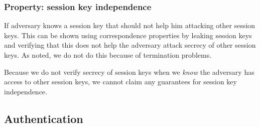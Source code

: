 \documentclass[a4paper,11pt]{article}
\theoremstyle{plain}
\theoremstyle{plain}
\begin{document}
\subsubsection{Property: session key independence}
%
If adversary knows a session key that should not help him attacking other
session keys.
%
This can be shown using correspondence properties by leaking session keys and
verifying that this does not help the adversary attack secrecy of other session
keys.
%
As noted, we do not do this because of termination problems.
%

Because we do not verify secrecy of session keys when we \emph{know} the
adversary has access to other session keys, we cannot claim any guarantees for
session key independence.
%

\subsection{Authentication}
\end{document}
